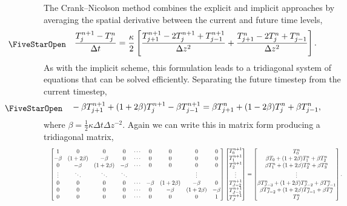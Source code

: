 The Crank--Nicolson method combines the explicit and implicit approaches by averaging the spatial derivative between the current and future time levels,
\[
    \workeq
    \frac{T_j^{n+1} - T_j^n}{\Delta t} = \frac{\kappa}{2}
    \left[
    \frac{T_{j+1}^{n+1} - 2T_j^{n+1} + T_{j-1}^{n+1}}{\Delta z^2} +
    \frac{T_{j+1}^{n} - 2T_j^{n} + T_{j-1}^{n}}{\Delta z^2}
    \right].
\]
As with the implicit scheme, this formulation leads to a tridiagonal system of equations that can be solved efficiently.
Separating the future timestep from the current timestep,
\begin{equation*}
    \workeq
    -\beta T_{j+1}^{n+1} + (1 + 2\beta) T_j^{n+1} - \beta T_{j-1}^{n+1} =
    \beta T_{j+1}^{n} + (1 - 2\beta) T_j^{n} + \beta T_{j-1}^{n} ,
\end{equation*}
where $\beta = \frac{1}{2} \kappa \Delta t \Delta z^{-2}$.  Again we can write this in matrix form producing a tridiagonal matrix,
\begin{align*}
    \resizebox{\textwidth}{!}{$
    \begin{bmatrix}
        1 & 0 & 0 & 0 & \cdots & 0 & 0 & 0 & 0 \\
        -\beta & (1 + 2\beta) & -\beta & 0 & \cdots & 0 & 0 & 0 & 0 \\
        0 & -\beta & (1 + 2\beta) & -\beta & \cdots & 0 & 0 & 0 & 0 \\
        \vdots & \ddots & \ddots & \ddots & & & & \vdots \\
        0 & 0 & 0 & 0 & \cdots & -\beta & (1 + 2\beta) & -\beta & 0 \\
        0 & 0 & 0 & 0 & \cdots & 0 & -\beta & (1 + 2\beta) & -\beta \\
        0 & 0 & 0 & 0 & \cdots & 0 & 0 & 0 & 1
    \end{bmatrix}
    \begin{bmatrix}
        T_{0}^{n+1} \\
        T_{1}^{n+1} \\
        T_{2}^{n+1} \\
        \vdots \\
        T_{J-2}^{n+1} \\
        T_{J-1}^{n+1} \\
        T_{J}^{n+1}
    \end{bmatrix}
    = 
    \begin{bmatrix}
        T_0^n \\
        \beta T_0 + (1 + 2\beta) T_1^n + \beta T_2^n \\
        \beta T_1^n + (1 + 2\beta) T_2^n + \beta T_3^n \\
        \vdots \\
        \beta T_{J-3}^n + (1 + 2\beta) T_{J-2}^n + \beta T_{J-1}^n \\
        \beta T_{J-2}^n + (1 + 2\beta) T_{J-1}^n + \beta T_{J}^n \\
        T_{J}^n
    \end{bmatrix} .
    $}
\end{align*}

